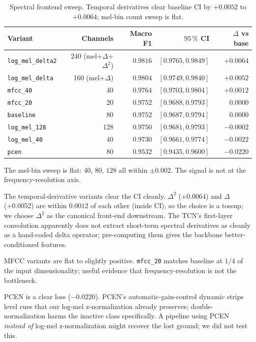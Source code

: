 \begin{table}[h]
\centering
\begin{tabular}{lrrrr}
\toprule
\textbf{Variant} & \textbf{Channels} & \textbf{Macro F1} & \textbf{$95\,\%$ CI} & \textbf{$\Delta$ vs base} \\
\midrule
\texttt{log\_mel\_delta2} & 240 (mel+$\Delta$+$\Delta^2$) & $\mathbf{0.9816}$ & $[0.9765, 0.9849]$ & $+0.0064$ \\
\texttt{log\_mel\_delta}  & 160 (mel+$\Delta$) & $\mathbf{0.9804}$ & $[0.9749, 0.9840]$ & $+0.0052$ \\
\texttt{mfcc\_40}         &  40 & $0.9764$          & $[0.9703, 0.9804]$ & $+0.0012$ \\
\texttt{mfcc\_20}         &  20 & $0.9752$          & $[0.9688, 0.9793]$ & $\phantom{+}0.0000$ \\
\texttt{baseline}         &  80 & $0.9752$          & $[0.9687, 0.9794]$ & $\phantom{+}0.0000$ \\
\texttt{log\_mel\_128}    & 128 & $0.9750$          & $[0.9681, 0.9793]$ & $-0.0002$ \\
\texttt{log\_mel\_40}     &  40 & $0.9730$          & $[0.9661, 0.9774]$ & $-0.0022$ \\
\texttt{pcen}             &  80 & $0.9532$          & $[0.9435, 0.9600]$ & $-0.0220$ \\
\bottomrule
\end{tabular}
\caption{Spectral frontend sweep. Temporal derivatives clear baseline CI by $+0.0052$ to $+0.0064$; mel-bin count sweep is flat.}
\label{tab:frontend_results}
\end{table}

The mel-bin sweep is flat: $40$, $80$, $128$ all within $\pm 0.002$.
The signal is not at the frequency-resolution axis.

The temporal-derivative variants clear the CI cleanly.
$\Delta^2$ (+0.0064) and $\Delta$ (+0.0052) are within $0.0012$ of each other (inside CI), so the choice is a tossup; we choose $\Delta^2$ as the canonical front-end downstream.
The TCN's first-layer convolution apparently does not extract short-term spectral derivatives as cleanly as a hand-coded delta operator; pre-computing them gives the backbone better-conditioned features.

MFCC variants are flat to slightly positive.
\texttt{mfcc\_20} matches baseline at $1/4$ of the input dimensionality; useful evidence that frequency-resolution is not the bottleneck.

PCEN is a clear loss ($-0.0220$).
PCEN's automatic-gain-control dynamic strips level cues that our log-mel z-normalization already preserves; double-normalization harms the inactive class specifically.
A pipeline using PCEN \emph{instead of} log-mel z-normalization might recover the lost ground; we did not test this.

